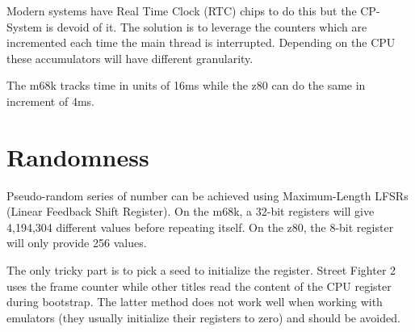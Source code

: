 Modern systems have Real Time Clock (RTC) chips to do this but the CP-System is devoid of it. The solution is to leverage the counters which are incremented each time the main thread is interrupted. Depending on the CPU these accumulators will have different granularity.

The m68k tracks time in units of 16ms while the z80 can do the same in increment of 4ms.


\section{Randomness}
Pseudo-random series of number can be achieved using Maximum-Length LFSRs (Linear Feedback Shift Register). On the m68k, a 32-bit registers will give 4,194,304 different values before repeating itself. On the z80, the 8-bit register will only provide 256 values.

The only tricky part is to pick a seed to initialize the register. Street Fighter 2 uses the frame counter while other titles read the content of the CPU register during bootstrap. The latter method does not work well when working with emulators (they usually initialize their registers to zero) and should be avoided.
